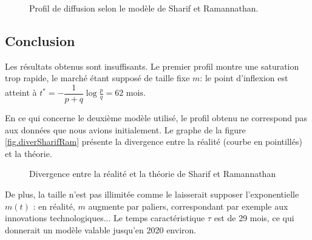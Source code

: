 		\begin{figure}[!h]
			\centering
			\caption{Profil de diffusion selon le modèle de Sharif et Ramannathan.\label{fig.SharifRaman}}
		\end{figure}
		
	\clearpage
		
	\subsection{Conclusion}
		
		Les résultats obtenus sont insuffisants. Le premier profil montre une saturation trop rapide, le marché étant supposé de taille fixe $m$: le point d'inflexion est atteint à $t^* = -\dfrac{1}{p+q} \log{\frac{p}{q}} = 62 \text{ mois}$.

		En ce qui concerne le deuxième modèle utilisé, le profil obtenu ne correspond pas aux données que nous avions initialement. Le graphe de la figure \vref{fig.diverSharifRam} présente la divergence entre la réalité (courbe en pointillés) et la théorie.
		
		\begin{figure}[!h]
			\centering
			\caption{Divergence entre la réalité et la théorie de Sharif et Ramannathan \label{fig.diverSharifRam}}
		\end{figure}
		
		De plus, la taille n'est pas illimitée comme le laisserait supposer l'exponentielle $m(t)$ : en réalité, $m$ augmente par paliers, correspondant par exemple aux innovations technologiques... Le temps caractéristique $\tau$ est de 29 mois, ce qui donnerait un modèle valable jusqu'en 2020 environ.
		

